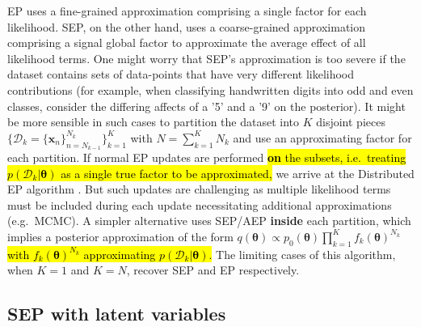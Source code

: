 EP uses a fine-grained approximation comprising a single factor for each likelihood. SEP, on the other hand, uses a coarse-grained approximation comprising a signal global factor to approximate the average effect of all likelihood terms. One might worry that SEP's approximation is too severe if the dataset contains sets of data-points that have very different likelihood contributions (for example, when classifying handwritten digits into odd and even classes, consider the differing affects of a '5' and a '9' on the posterior). It might be more sensible in such cases to partition the dataset into $K$ disjoint pieces $\{ \mathcal{D}_k = \{\bm{x}_n\}_{n=N_{k-1}}^{N_k} \}_{k=1}^{K}$ with $N = \sum_{k=1}^K N_k$ and use an approximating factor for each partition. If normal EP updates are performed \hl{\textbf{on} the subsets, i.e.~treating $p(\mathcal{D}_k|\bm{\theta})$ as a single true factor to be approximated,} we arrive at the Distributed EP algorithm \cite{gelman:dep, xu:sms}. But such updates are challenging as multiple likelihood terms must be included during each update necessitating additional approximations (e.g.~MCMC). A simpler alternative uses SEP/AEP \textbf{inside} each partition, which implies a posterior approximation of the form $q(\bm{\theta}) \propto p_0(\bm{\theta}) \prod_{k=1}^K f_{k}(\bm{\theta})^{N_k}$ \hl{with $f_{k}(\bm{\theta})^{N_k}$ approximating $p(\mathcal{D}_k|\bm{\theta})$.} The limiting cases of this algorithm, when $K=1$ and $K=N$, recover SEP and EP respectively. 


\subsection{SEP with latent variables}

